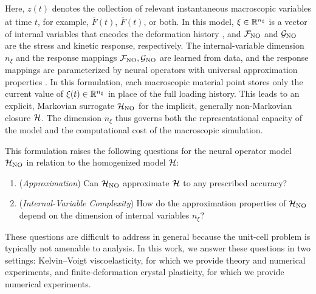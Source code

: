 \documentclass[3p, 12pt, preprint]{elsarticle}
\begin{document}
Here, $z(t)$ denotes the collection of relevant instantaneous macroscopic variables at time $t$, for example, $\overline{F}(t)$, $\dot{\overline{F}}(t)$, or both. In this model, $\xi\in\mathbb{R}^{n_{\xi}}$ is a vector of internal variables that encodes the deformation history \cite{coleman1967thermodynamics,rice1971inelastic,halphen1975sur, he2022thermodynamically, jones2022neural, liu2023learning, bhattacharya2023learning, rosenkranz2024viscoelasticity, flaschel2025convex, jones2025attention, qiu2025bridging}, and {${\mathcal{F}}_{\rm NO}$ and ${\mathcal{G}}_{\rm NO}$} are the stress and kinetic response, respectively. The internal-variable dimension $n_{\xi}$ and the response mappings {${\mathcal{F}}_{\rm NO},{\mathcal{G}}_{\rm NO}$} are learned from data, and the response mappings are parameterized by neural operators with universal approximation properties \cite{lu2021learning, kovachki2023neural, lanthaler2025nonlocality}. In this formulation, each macroscopic material point stores only the current value of $\xi(t)\in\mathbb{R}^{n_\xi}$ in place of the full loading history. This leads to an explicit, Markovian surrogate ${\mathcal{H}}_{\rm NO}$ for the implicit, generally non-Markovian closure ${\mathcal{H}}$. The dimension $n_{\xi}$ thus governs both the representational capacity of the model and the computational cost of the macroscopic simulation.

\begin{remark} \label{rem:one}
\end{remark}

This formulation raises the following questions for the neural operator model ${\mathcal{H}}_{\rm NO}$ in relation to the homogenized model ${\mathcal{H}}$:
\begin{enumerate}[label=(Q\arabic*), ref=Q\arabic*]
    \item\label{q:representation} (\textit{Approximation}) Can ${\mathcal{H}}_{\rm NO}$ approximate ${\mathcal{H}}$ to any prescribed accuracy?
    \item\label{q:model_complexity} (\textit{Internal-Variable Complexity}) How do the approximation properties of ${\mathcal{H}}_{\rm NO}$ depend on the dimension of internal variables $n_{\xi}$?
\end{enumerate}
These questions are difficult to address in general because the unit-cell problem is typically not amenable to analysis. In this work, we answer these questions in two settings: Kelvin--Voigt viscoelasticity, for which we provide theory and numerical experiments, and finite-deformation crystal plasticity, for which we provide numerical experiments. 
\end{document}
